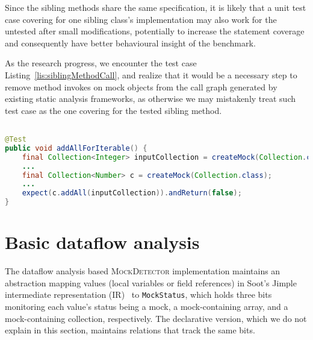 Since the sibling methods share the same specification, it is likely that a unit test case covering for one sibling class's implementation may also work for the untested after small modifications, potentially to increase the statement coverage and consequently have better behavioural insight of the benchmark.

As the research progress, we encounter the test case Listing~\ref{lis:siblingMethodCall}, and realize that it would be a necessary step to remove method invokes on mock objects from the call graph generated by existing static analysis frameworks, as otherwise we may mistakenly treat such test case as the one covering for the tested sibling method.

\begin{lstlisting}[basicstyle=\ttfamily, caption={This code snippet illustrates an example from commons-collections4, where the method \textit{addAll()} invoked on the mock object \texttt{c} could be mistreated as a focal method being covered by existing static analysis frameworks.},
basicstyle=\ttfamily,language = Java, framesep=4.5mm, escapechar=|,
framexleftmargin=1.0mm, captionpos=b, label=lis:siblingMethodCall, morekeywords={@Test}]

@Test
public void addAllForIterable() {
	final Collection<Integer> inputCollection = createMock(Collection.class);
	...
	final Collection<Number> c = createMock(Collection.class);
	...
	expect(c.addAll(inputCollection)).andReturn(false);
}
\end{lstlisting}

\section{Basic dataflow analysis} 

The dataflow analysis based \textsc{MockDetector} implementation maintains an abstraction mapping values (local variables or field references) in Soot's Jimple intermediate representation (IR)~\cite{Vallee-Rai:1999:SJB:781995.782008} to \texttt{MockStatus}, which holds three bits monitoring each value's status being a mock, a mock-containing array, and a mock-containing collection, respectively. The declarative version, which we do not explain in this section, maintains relations that track the same bits.

